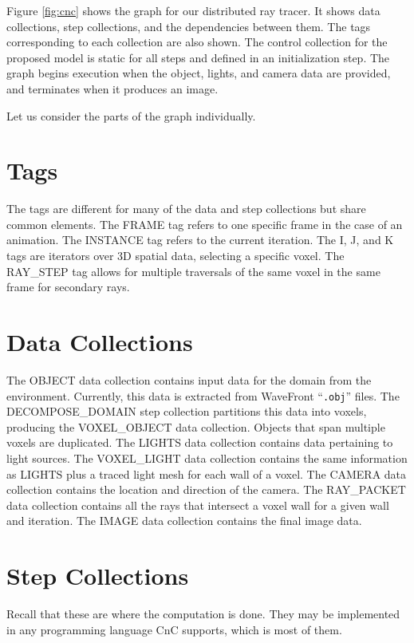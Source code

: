 Figure \ref{fig:cnc} shows the graph for our distributed ray tracer.
It shows data collections, step collections, and the dependencies
between them. The tags corresponding to each collection are also
shown. The control collection for the proposed model is static for all
steps and defined in an initialization step. The graph begins
execution when the object, lights, and camera data are provided, and
terminates when it produces an image.

Let us consider the parts of the graph individually.

\section{Tags}

The tags are different for many of the data and step collections but
share common elements. The FRAME tag refers to one specific frame in
the case of an animation. The INSTANCE tag refers to the current
iteration. The I, J, and K tags are iterators over 3D spatial data,
selecting a specific voxel. The RAY\_STEP tag allows for multiple
traversals of the same voxel in the same frame for secondary rays.

\section{Data Collections}
\label{sec:datacollections}

The OBJECT data collection contains input data for the domain from the
environment. Currently, this data is extracted from WaveFront
``\texttt{.obj}'' files. The DECOMPOSE\_DOMAIN step collection
partitions this data into voxels, producing the VOXEL\_OBJECT data
collection. Objects that span multiple voxels are duplicated. The
LIGHTS data collection contains data pertaining to light sources. The
VOXEL\_LIGHT data collection contains the same information as LIGHTS
plus a traced light mesh for each wall of a voxel. The CAMERA data
collection contains the location and direction of the camera. The
RAY\_PACKET data collection contains all the rays that intersect a
voxel wall for a given wall and iteration. The IMAGE data collection
contains the final image data.

\section{Step Collections}

Recall that these are where the computation is done. They may be
implemented in any programming language CnC supports, which is most of
them.

